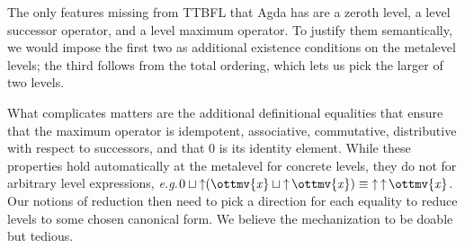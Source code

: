 \documentclass[a4paper,UKenglish,cleveref,autoref,thm-restate]{lipics-v2021}
\makeatletter
\newcommand{\lang}{TTBFL\@\xspace}
\newcommand{\eg}{\textit{e.g.}\@\xspace}
\makeatother
\begin{document}
The only features missing from \lang that Agda has are a zeroth level,
a level successor operator, and a level maximum operator.
To justify them semantically,
we would impose the first two as additional existence conditions on the metalevel levels;
the third follows from the total ordering, which lets us pick the larger of two levels.
%

What complicates matters are the additional definitional equalities that
ensure that the maximum operator is idempotent, associative, commutative,
distributive with respect to successors,
and that $0$ is its identity element.
While these properties hold automatically at the metalevel for concrete levels,
they do not for arbitrary level expressions,
\eg $   0   \sqcup   \mathop{\uparrow}   (   \mathit{ \ottmv{x} }   \sqcup   \mathop{\uparrow}   \mathit{ \ottmv{x} }    )     \equiv   \mathop{\uparrow}   \mathop{\uparrow}   \mathit{ \ottmv{x} }    $.
Our notions of reduction then need to pick a direction for each equality
to reduce levels to some chosen canonical form.
We believe the mechanization to be doable but tedious.
\end{document}
